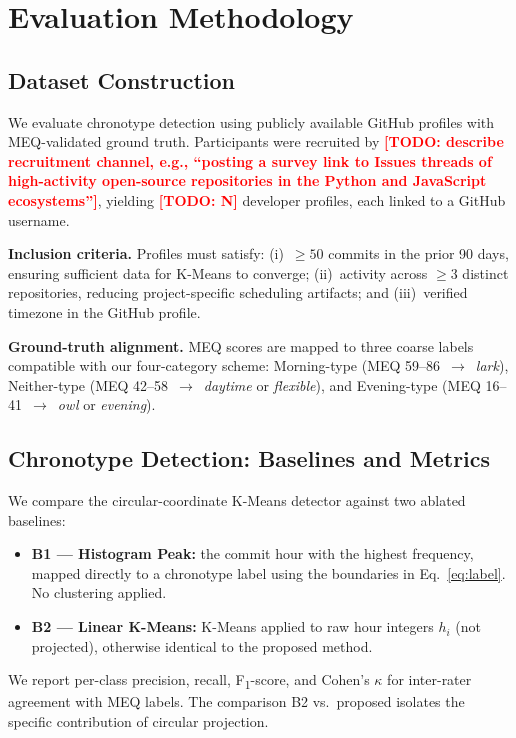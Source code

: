 \documentclass[conference]{IEEEtran}
\newcommand{\TODO}[1]{\textcolor{red}{\textbf{[TODO: #1]}}}
\begin{document}
\section{Evaluation Methodology}
\label{sec:eval}

\subsection{Dataset Construction}

We evaluate chronotype detection using publicly available GitHub
profiles with MEQ-validated ground truth.
Participants were recruited by \TODO{describe recruitment channel,
e.g., ``posting a survey link to Issues threads of high-activity
open-source repositories in the Python and JavaScript ecosystems''},
yielding \TODO{N} developer profiles, each linked to a GitHub username.

\textbf{Inclusion criteria.}
Profiles must satisfy: (i)~$\geq 50$ commits in the prior 90 days,
ensuring sufficient data for K-Means to converge; (ii)~activity across
$\geq 3$ distinct repositories, reducing project-specific scheduling
artifacts; and (iii)~verified timezone in the GitHub profile.

\textbf{Ground-truth alignment.}
MEQ scores are mapped to three coarse labels compatible with our
four-category scheme: Morning-type (MEQ 59–86~$\to$~\textit{lark}),
Neither-type (MEQ 42–58~$\to$~\textit{daytime} or
\textit{flexible}), and Evening-type
(MEQ 16–41~$\to$~\textit{owl} or \textit{evening}).

\subsection{Chronotype Detection: Baselines and Metrics}

We compare the circular-coordinate K-Means detector against two
ablated baselines:
\begin{itemize}
  \item \textbf{B1 — Histogram Peak:} the commit hour with the
        highest frequency, mapped directly to a chronotype label using
        the boundaries in Eq.~\eqref{eq:label}. No clustering applied.
  \item \textbf{B2 — Linear K-Means:} K-Means applied to raw hour
        integers $h_i$ (not projected), otherwise identical to the
        proposed method.
\end{itemize}
We report per-class precision, recall, F\textsubscript{1}-score, and
Cohen's $\kappa$ for inter-rater agreement with MEQ labels.
The comparison B2 vs.\ proposed isolates the specific contribution of
circular projection.
\end{document}
